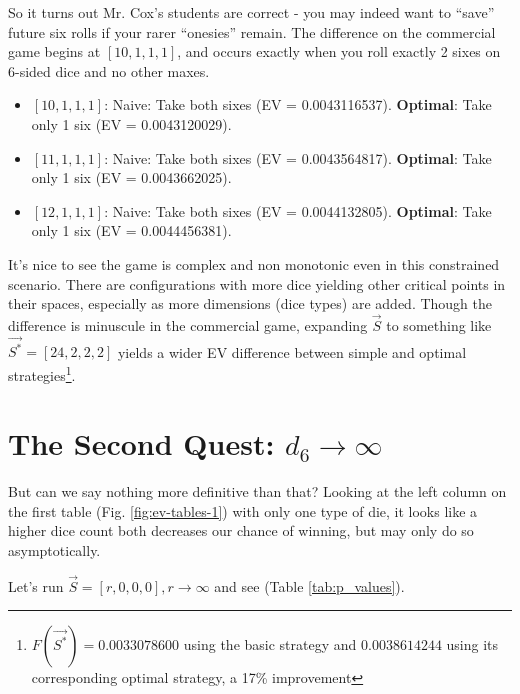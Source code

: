 \documentclass[11pt, oneside]{article} 	%
\begin{document}
So it turns out Mr. Cox's students are correct - you may indeed want to ``save'' future six rolls if your rarer ``onesies'' remain.  The difference on the commercial game begins at $[10,1,1,1]$, and occurs exactly when you roll exactly 2 sixes on 6-sided dice and no other maxes.

\begin{itemize}
 \item $[10,1,1,1]$: Naive: Take both sixes (EV = 0.0043116537).  \textbf{Optimal}: Take only 1 six (EV = 0.0043120029).
 \item $[11,1,1,1]$: Naive: Take both sixes (EV = 0.0043564817).  \textbf{Optimal}: Take only 1 six (EV = 0.0043662025).
 \item $[12,1,1,1]$: Naive: Take both sixes (EV = 0.0044132805).  \textbf{Optimal}: Take only 1 six (EV = 0.0044456381).
\end{itemize}

It's nice to see the game is complex and non monotonic even in this constrained scenario.    There are configurations with more dice yielding other critical points in their spaces, especially as more dimensions (dice types) are added.  Though the difference is minuscule in the commercial game, expanding $\vec{S}$ to something like $\vec{S^*} = [24,2,2,2]$ yields a wider EV difference between simple and optimal strategies\footnote{$F(\vec{S^*}) = 0.0033078600$ using the basic strategy and $0.0038614244$ using its corresponding optimal strategy, a 17\% improvement}.

\section{The Second Quest: $d_6 \rightarrow \infty$}

But can we say nothing more definitive than that?  Looking at the left column on the first table (Fig. \ref{fig:ev-tables-1}) with only one type of die, it looks like a higher dice count both decreases our chance of winning, but may only do so asymptotically.

Let's run $\vec{S} = [r, 0, 0, 0], r \rightarrow \infty$ and see (Table \ref{tab:p_values}).
\end{document}
